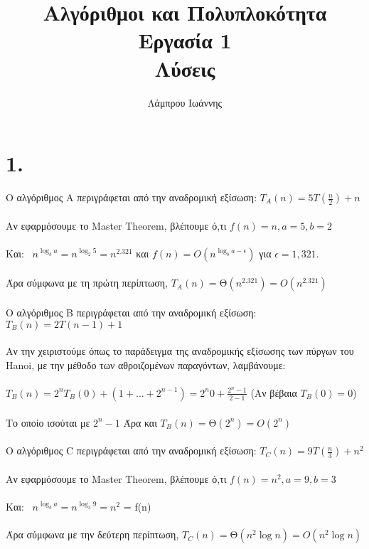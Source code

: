 \documentclass{article}
\begin{document}
\title{\vspace{-3.5cm}\textbf{Αλγόριθμοι και Πολυπλοκότητα}\\Εργασία 1 \\ Λύσεις}
\author{Λάμπρου Ιωάννης}

\maketitle
\section*{1.}
Ο αλγόριθμος \textlatin{A} περιγράφεται από την αναδρομική εξίσωση: $T_A(n) = 5T(\frac{n}{2}) + n$\\\\
Αν εφαρμόσουμε το \textlatin{Master Theorem}, βλέπουμε ό,τι $f(n) = n, a=5, b=2$\\\\
Και: \  $n^{\log_b{a}} = n^{\log_2{5}} = n^{2.321}$ και
$f(n) = O(n^{\log_b{a-\epsilon}}) $ για $\epsilon = 1,321$.\\\\
Άρα σύμφωνα με τη πρώτη περίπτωση, $T_A(n) = $Θ$(n^{2.321})=O(n^{2.321})$\\\\

Ο αλγόριθμος \textlatin{B} περιγράφεται από την αναδρομική εξίσωση: $T_B(n) = 2T(n-1) + 1$\\\\
Αν την χειριστούμε όπως το παράδειγμα της αναδρομικής εξίσωσης των πύργων του \textlatin{Hanoi}, με την μέθοδο των αθροιζομένων παραγόντων, λαμβάνουμε:\\\\
$T_B(n) = 2^nT_B(0) + (1 + ... + 2^{n-1}) = 2^n0 + \frac{2^n-1}{2-1}$ (Αν βέβαια $T_B(0) = 0$)\\\\
Το οποίο ισούται με $2^n-1$ Άρα και $T_B(n)=$Θ$(2^n)=O(2^n)$\\\\

Ο αλγόριθμος \textlatin{C} περιγράφεται από την αναδρομική εξίσωση: $T_C(n) = 9T(\frac{n}{3}) + n^2$\\\\
Αν εφαρμόσουμε το \textlatin{Master Theorem}, βλέπουμε ό,τι $f(n) = n^2, a=9, b=3$\\\\
Και: \  $n^{\log_b{a}} = n^{\log_3{9}} = n^2$ = f(n)\\\\
Άρα σύμφωνα με την δεύτερη περίπτωση, $T_C(n) = $Θ$(n^{2}\log{n})=O(n^{2}\log{n})$\\\\\\
\end{document}
